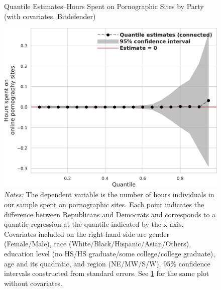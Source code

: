\documentclass[12pt, letterpaper]{article}
\begin{document}
\begin{figure}[ht]
	\centering
	\caption{Quantile Estimates--Hours Spent on Pornographic Sites by Party (with covariates, Bitdefender)}
	\includegraphics[width=.55\linewidth]{figs/bitdefender_quantile_reg_covariates_duration_adult.pdf}
	\caption*{\footnotesize \emph{Notes:} 
		The dependent variable is the number of hours individuals in our sample spent on pornographic sites.
		Each point indicates the difference between Republicans and Democrats and corresponds to a quantile regression at the quantile indicated by the x-axis.
		Covariates included on the right-hand side are gender (Female/Male), race (White/Black/Hispanic/Asian/Others), education level (no HS/HS graduate/some college/college graduate), age and its quadratic, and region (NE/MW/S/W).
		95\% confidence intervals constructed from standard errors.
		See \cref{fig:bitdefender_quantile_regression_duration_covariates} for the same plot without covariates.
	}
	\label{fig:bitdefender_quantile_regression_duration_covariates}
\end{figure}


\FloatBarrier
\clearpage
\end{document}
